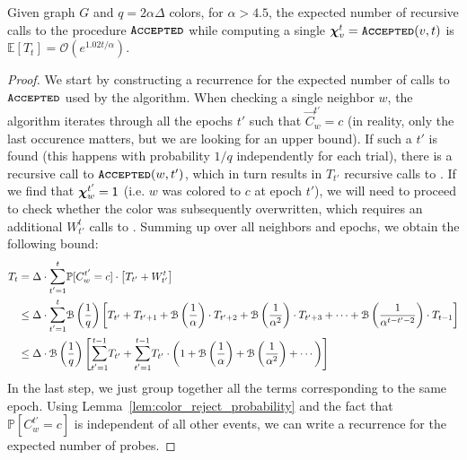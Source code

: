 \begin{lemma}
\label{lem:coloring_recurrence}
Given graph $G$ and $q=2\alpha\Delta$ colors, for $\alpha > 4.5$, the expected number of recursive calls to the procedure $\texttt{\textsc{Accepted}}$
while computing a single $\bm\chi^t_v = \texttt{\textsc{Accepted}}(v,t)$ is $\mathbb E[T_t] = \mathcal{O}\left(e^{1.02t/\alpha}\right)$.
\end{lemma}
\begin{proof}
We start by constructing a recurrence for the expected number of calls to $\texttt{\textsc{Accepted}}$ used by the algorithm.
When checking a single neighbor $w$, the algorithm iterates through all the epochs $t'$ such that $\vec C^{t'}_w = c$
(in reality, only the last occurence matters, but we are looking for an upper bound).
If such a $t'$ is found (this happens with probability $1/q$ independently for each trial), there is a recursive call to $\texttt{\textsc{Accepted}}(w,t')$,
which in turn results in $T_{t'}$ recursive calls to .
If we find that $\bm\chi^{t'}_w = \mathsf{1}$ (i.e. $w$ was colored to $c$ at epoch $t'$),
we will need to proceed to check whether the color was subsequently overwritten, which requires an additional $W^t_{t'}$ calls to .
Summing up over all neighbors and epochs, we obtain the following bound:
\begin{align}
T_{t} &= \Delta \cdot \mathlarger\sum\limits_{t'=1}^{t} \mathbb P[C^{t'}_w = c]\cdot
\left[ T_{t'} + W^t_{t'} \right] \\
&\le \Delta \cdot \mathlarger\sum\limits_{t'=1}^{t} \mathcal B\left( \frac 1q\right)
\left[ T_{t'} + T_{t'+1} + \mathcal B\left(\frac{1}{\alpha}\right)\cdot T_{t'+2} + \mathcal B\left(\frac{1}{\alpha^2}\right)\cdot T_{t'+3}
+ \cdots + \mathcal B\left(\frac{1}{\alpha^{t-t'-2}}\right)\cdot T_{t-1} \right]\\
&\le \Delta\cdot\mathcal B\left( \frac{1}{q}\right) \Biggl[
\mathlarger\sum\limits_{t'=1}^{t-1} T_{t'} +
\mathlarger\sum\limits_{t'=1}^{t-1} T_{t'}\cdot \left(1 + \mathcal B\left(\frac1\alpha\right) + \mathcal B\left(\frac1{\alpha^2}\right) + \cdots\right)
\Biggr]
\end{align}
In the last step, we just group together all the terms corresponding to the same epoch.
Using Lemma~\ref{lem:color_reject_probability} and the fact that $\mathbb P[C^{t'}_w = c]$ is independent of all other events,
we can write a recurrence for the expected number of probes.

\end{proof}
